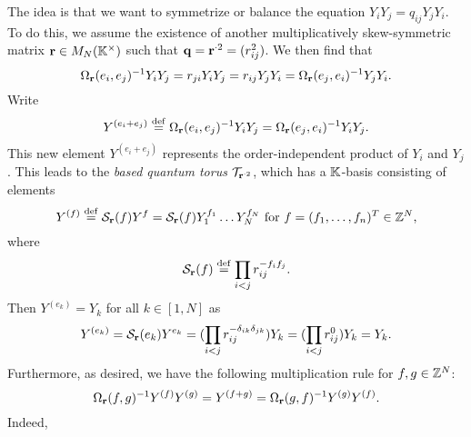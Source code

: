 \medskip

The idea is that we want to symmetrize or balance the equation $Y_i Y_j = q_{ij} Y_j
	Y_i$. To do this, we assume the existence of another multiplicatively skew-symmetric
matrix $\mathbf{r} \in M_N(\mathbb{K}^\times)$ such that $\mathbf{q} = \mathbf{r}^{\cdot 2} = (r_{ij}^2)$. We
then find that
\begin{equation*}
	\Omega_{\mathbf{r}}(e_i, e_j)^{-1} Y_i Y_j = r_{ji} Y_i Y_j = r_{ij} Y_j Y_i = \Omega_{\mathbf{r}} (e_j, e_i)^{-1} Y_j Y_i.
\end{equation*}
%
Write
\begin{equation*}
	Y^{(e_i + e_j)} \overset{\mathrm{def}}{=} \Omega_{\mathbf{r}}(e_i, e_j)^{-1} Y_i Y_j = \Omega_{\mathbf{r}}(e_j, e_i)^{-1} Y_i Y_j.
\end{equation*}
%
This new element $Y^{(e_i + e_j)}$ represents the order-independent product of $Y_i$
and $Y_j$. This leads to the \emph{based quantum torus}
$\mathcal{T}_{\mathbf{r}^{\cdot 2}}$, which has a $\mathbb{K}$-basis consisting of elements
\begin{equation*}
	Y^{(f)} \overset{\mathrm{def}}{=} \mathcal{S}_{\mathbf{r}}(f)Y^f = \mathcal{S}_{\mathbf{r}}(f)Y_1^{f_1}\dots Y_N^{f_N}
	\text{ for } f = (f_1, \dots, f_n)^T \in \mathbb{Z}^N,
\end{equation*}
%
%
where
\begin{equation*}
	\mathcal{S}_{\mathbf{r}}(f) \overset{\mathrm{def}}{=} \prod_{i < j}r_{ij}^{-f_if_j}.
\end{equation*}
%
%
Then $Y^{(e_k)} = Y_k$ for all $k \in [1, N]$ as
\begin{align*}
	Y^{(e_k)}
	= \mathcal{S}_{\mathbf{r}}(e_k)Y^{e_k}
	= (\prod_{i < j}r_{ij}^{-\delta_{ik}\delta_{jk}} )Y_k
	= (\prod_{i < j}r_{ij}^0 )Y_k
	= Y_k.
\end{align*}
Furthermore, as desired, we have the following multiplication rule for $f,g \in \mathbb{Z}^N$:
\begin{equation*}
	\Omega_{\mathbf{r}}(f,g)^{-1} Y^{(f)}Y^{(g)} = Y^{(f+g)} = \Omega_{\mathbf{r}} (g, f)^{-1} Y^{(g)}Y^{(f)}.
\end{equation*}
Indeed,
